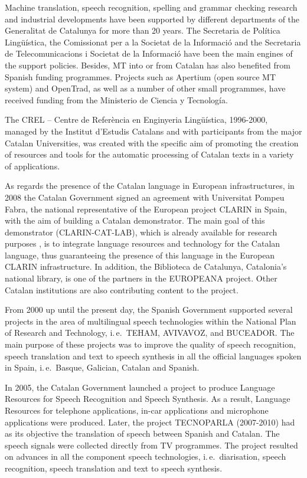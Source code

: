 \begin{multicols}{2}
Machine translation, speech recognition, spelling and grammar checking research and industrial developments have been supported by different departments of the Generalitat de Catalunya for more than 20 years. The Secretaria de Política Lingüística, the Comissionat per a la Societat de la Informació and the Secretaria de Telecomunicacions i Societat de la Informació have been the main engines of the support policies. Besides, MT into or from Catalan has also benefited from Spanish funding programmes. Projects such as Apertium (open source MT system) and OpenTrad, as well as a number of other small programmes, have received funding from the Ministerio de Ciencia y Tecnología. 

The CREL – Centre de Referència en Enginyeria Lingüística, 1996-2000, managed by the Institut d’Estudis Catalans and with participants from the major Catalan Universities, was created with the specific aim of promoting the creation of resources and tools for the automatic processing of Catalan texts in a variety of applications. 

As regards the presence of the Catalan language in European infrastructures, in 2008 the Catalan Government signed an agreement with Universitat Pompeu Fabra, the national representative of the European project CLARIN in Spain, with the aim of building a Catalan demonstrator. The main goal of this demonstrator (CLARIN-CAT-LAB), which is already available for research purposes \cite{CAT-Nota30}, is to integrate language resources and technology for the Catalan language, thus guaranteeing the presence of this language in the European CLARIN infrastructure. In addition, the Biblioteca de Catalunya, Catalonia’s national library, is one of the partners in the EUROPEANA project. Other Catalan institutions are also contributing content to the project.

From 2000 up until the present day, the Spanish Government supported several projects in the area of multilingual speech technologies within the National Plan of Research and Technology, i.\,e.~TEHAM, AVIVAVOZ, and BUCEADOR. The main purpose of these projects was to improve the quality of speech recognition, speech translation and text to speech synthesis in all the official languages spoken in Spain, i.\,e.~Basque, Galician, Catalan and Spanish.

In 2005, the Catalan Government launched a project to produce Language Resources for Speech Recognition and Speech Synthesis. As a result, Language Resources for telephone applications, in-car applications and microphone applications were produced. Later, the project TECNOPARLA (2007-2010) had as its objective the translation of speech between Spanish and Catalan. The speech signals were collected directly from TV programmes. The project resulted on advances in all the component speech technologies, i.\,e.~diarisation, speech recognition, speech translation and text to speech synthesis.
  

\end{multicols}
